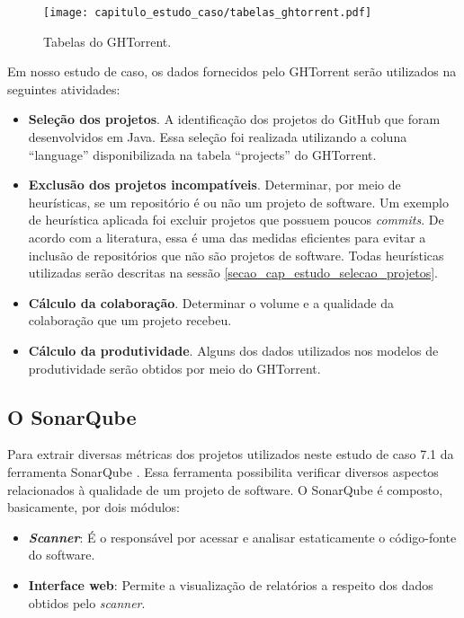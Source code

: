  \begin{figure}[H]
  \centering
  \texttt{[image: capitulo\_estudo\_caso/tabelas\_ghtorrent.pdf]} 
  \caption{Tabelas do GHTorrent.}
  \label{fig:tabelas_ghtorrent} 
\end{figure}

Em nosso estudo de caso, os dados fornecidos pelo GHTorrent serão utilizados na seguintes atividades:

\begin{itemize}
\item \textbf{Seleção dos projetos}. A identificação dos projetos do GitHub que foram desenvolvidos em Java. Essa seleção foi realizada utilizando a coluna ``language'' disponibilizada na tabela ``projects'' do GHTorrent.
\item \textbf{Exclusão dos projetos incompatíveis}. Determinar, por meio de heurísticas,  se um repositório é ou não um projeto de software. Um exemplo de heurística aplicada foi excluir projetos que possuem poucos \textit{commits}. De acordo com a literatura, essa é uma das medidas eficientes para evitar a inclusão de repositórios que não são projetos de software. Todas heurísticas utilizadas serão descritas na sessão \ref{secao_cap_estudo_selecao_projetos}.
\item \textbf{Cálculo da colaboração}. Determinar  o volume e a qualidade  da colaboração que um projeto recebeu.
\item \textbf{Cálculo da produtividade}. Alguns dos dados utilizados nos modelos de produtividade serão obtidos por meio do GHTorrent.
\end{itemize}


\subsection{O SonarQube}

Para extrair diversas métricas dos projetos utilizados neste estudo de caso 7.1 da ferramenta SonarQube\cite{campbell2013sonarqube} . Essa ferramenta possibilita verificar diversos aspectos relacionados à qualidade de um projeto de software.  O SonarQube é composto, basicamente, por dois módulos: 

\begin{itemize}

\item \textbf{\textit{Scanner}}: É o responsável por acessar e analisar estaticamente o código-fonte do software.
\item \textbf{Interface web}: Permite a visualização de relatórios a respeito dos dados obtidos pelo \textit{scanner}.

\end{itemize}



